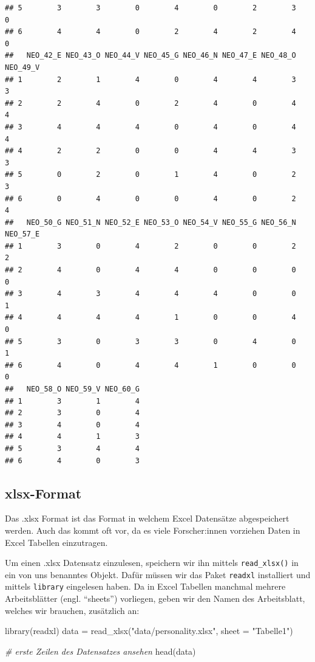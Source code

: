 \documentclass[
]{book}
\newenvironment{Shaded}{\begin{snugshade}}{\end{snugshade}}
\newcommand{\AttributeTok}[1]{\textcolor[rgb]{0.77,0.63,0.00}{#1}}
\newcommand{\CommentTok}[1]{\textcolor[rgb]{0.56,0.35,0.01}{\textit{#1}}}
\newcommand{\FunctionTok}[1]{\textcolor[rgb]{0.00,0.00,0.00}{#1}}
\newcommand{\NormalTok}[1]{#1}
\newcommand{\OtherTok}[1]{\textcolor[rgb]{0.56,0.35,0.01}{#1}}
\newcommand{\StringTok}[1]{\textcolor[rgb]{0.31,0.60,0.02}{#1}}
\begin{document}
\begin{verbatim}
## 5        3        3        0        4        0        2        3        0
## 6        4        4        0        2        4        2        4        0
##   NEO_42_E NEO_43_O NEO_44_V NEO_45_G NEO_46_N NEO_47_E NEO_48_O NEO_49_V
## 1        2        1        4        0        4        4        3        3
## 2        2        4        0        2        4        0        4        4
## 3        4        4        4        0        4        0        4        4
## 4        2        2        0        0        4        4        3        3
## 5        0        2        0        1        4        0        2        3
## 6        0        4        0        0        4        0        2        4
##   NEO_50_G NEO_51_N NEO_52_E NEO_53_O NEO_54_V NEO_55_G NEO_56_N NEO_57_E
## 1        3        0        4        2        0        0        2        2
## 2        4        0        4        4        0        0        0        0
## 3        4        3        4        4        4        0        0        1
## 4        4        4        4        1        0        0        4        0
## 5        3        0        3        3        0        4        0        1
## 6        4        0        4        4        1        0        0        0
##   NEO_58_O NEO_59_V NEO_60_G
## 1        3        1        4
## 2        3        0        4
## 3        4        0        4
## 4        4        1        3
## 5        3        4        4
## 6        4        0        3
\end{verbatim}

\hypertarget{xlsx-format}{%
\subsection{xlsx-Format}\label{xlsx-format}}

Das .xlsx Format ist das Format in welchem Excel Datensätze abgespeichert werden. Auch das kommt oft vor, da es viele Forscher:innen vorziehen Daten in Excel Tabellen einzutragen.

Um einen .xlsx Datensatz einzulesen, speichern wir ihn mittels \texttt{read\_xlsx()} in ein von uns benanntes Objekt. Dafür müssen wir das Paket \texttt{readxl} installiert und mittels \texttt{library} eingelesen haben. Da in Excel Tabellen manchmal mehrere Arbeitsblätter (engl. ``sheets'') vorliegen, geben wir den Namen des Arbeitsblatt, welches wir brauchen, zusätzlich an:

\begin{Shaded}
\begin{Highlighting}[]
\FunctionTok{library}\NormalTok{(readxl)}
\NormalTok{data }\OtherTok{=} \FunctionTok{read\_xlsx}\NormalTok{(}\StringTok{"data/personality.xlsx"}\NormalTok{, }\AttributeTok{sheet =} \StringTok{"Tabelle1"}\NormalTok{)}

\CommentTok{\# erste Zeilen des Datensatzes ansehen}
\FunctionTok{head}\NormalTok{(data)}
\end{Highlighting}
\end{Shaded}
\end{document}
